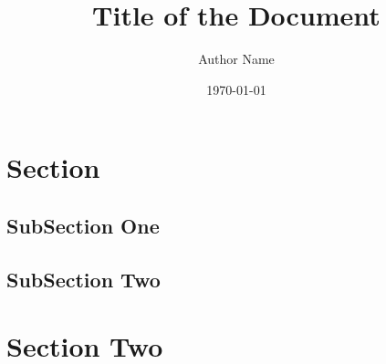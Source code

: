 \documentclass[12pt, twoside]{article}
\title{\vspace{-2cm}Title of the Document\vspace{-5mm}}
\author{Author Name\vspace{-5mm}}
\date{\today}
\begin{document}

\maketitle\thispagestyle{firststyle}

\section{Section}

\subsection{SubSection One}

\lipsum[2-4]

\subsection{SubSection Two}

\lipsum[3-5]

\section{Section Two}

\lipsum[1-5]
\end{document}
